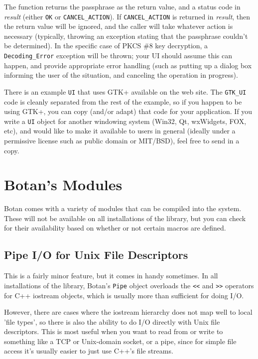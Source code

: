 \documentclass{article}
\newcommand{\keyword}[1]{\texttt{#1}}
\newcommand{\type}[1]{\texttt{#1}}
\renewcommand{\arg}[1]{\textsl{#1}}
\begin{document}
The function returns the passphrase as the return value, and a status code in
\arg{result} (either \type{OK} or \type{CANCEL\_ACTION}). If
\type{CANCEL\_ACTION} is returned in \arg{result}, then the return value will
be ignored, and the caller will take whatever action is necessary (typically,
throwing an exception stating that the passphrase couldn't be determined). In
the specific case of PKCS \#8 key decryption, a \type{Decoding\_Error}
exception will be thrown; your UI should assume this can happen, and provide
appropriate error handling (such as putting up a dialog box informing the user
of the situation, and canceling the operation in progress).

There is an example \type{UI} that uses GTK+ available on the web site. The
\type{GTK\_UI} code is cleanly separated from the rest of the example, so if
you happen to be using GTK+, you can copy (and/or adapt) that code for your
application. If you write a \type{UI} object for another windowing system
(Win32, Qt, wxWidgets, FOX, etc), and would like to make it available to users
in general (ideally under a permissive license such as public domain or
MIT/BSD), feel free to send in a copy.

\pagebreak
\section{Botan's Modules}

Botan comes with a variety of modules that can be compiled into the system.
These will not be available on all installations of the library, but you can
check for their availability based on whether or not certain macros are
defined.

\subsection{Pipe I/O for Unix File Descriptors}

This is a fairly minor feature, but it comes in handy sometimes. In all
installations of the library, Botan's \type{Pipe} object overloads the
\keyword{<<} and \keyword{>>} operators for C++ iostream objects, which is
usually more than sufficient for doing I/O.

However, there are cases where the iostream hierarchy does not map well to
local 'file types', so there is also the ability to do I/O directly with Unix
file descriptors. This is most useful when you want to read from or write to
something like a TCP or Unix-domain socket, or a pipe, since for simple file
access it's usually easier to just use C++'s file streams.
\end{document}
